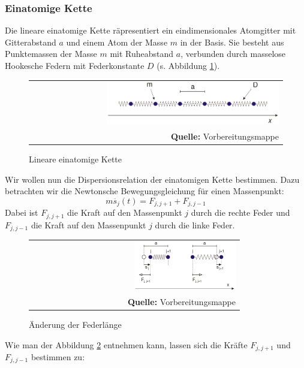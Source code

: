 \documentclass[a4paper,titlepage]{scrartcl}
\numberwithin{equation}{section}
\begin{document}
\subsubsection{Einatomige Kette}
Die lineare einatomige Kette räpresentiert ein eindimensionales Atomgitter mit Gitterabstand $a$ und einem Atom der Masse $m$ in der Basis. Sie besteht aus Punktemassen der Masse $m$ mit Ruheabstand $a$, verbunden durch masselose Hookesche Federn mit Federkonstante $D$ (s. Abbildung \ref{fig:einatomkette}).
\begin{figure}[H]
	\centering
	\begin{tabular}{@{}r@{}}
		\includegraphics[width=0.7\textwidth]{einatomkette.png}\\
		\footnotesize\sffamily\textbf{Quelle:} Vorbereitungsmappe \cite{vorbereitungsmappe}
	\end{tabular}
	\caption{Lineare einatomige Kette}
    \label{fig:einatomkette}
\end{figure}
Wir wollen nun die Dispersionsrelation der einatomigen Kette bestimmen. Dazu betrachten wir die Newtonsche Bewegungsgleichung für einen Massenpunkt:
\begin{equation*}
m\ddot{s_j}(t)=F_{j,j+1}+F_{j,j-1}
\end{equation*}
Dabei ist $F_{j,j+1}$ die Kraft auf den Massenpunkt $j$ durch die rechte Feder und $F_{j,j-1}$ die Kraft auf den Massenpunkt $j$ durch die linke Feder.
\begin{figure}[H]
	\centering
	\begin{tabular}{@{}r@{}}
		\includegraphics[width=0.5\textwidth]{einatomkettekraft.png}\\
		\footnotesize\sffamily\textbf{Quelle:} Vorbereitungsmappe \cite{vorbereitungsmappe}
	\end{tabular}
	\caption{Änderung der Federlänge}
    \label{fig:einatomkettekraft}
\end{figure}
Wie man der Abbildung \ref{fig:einatomkettekraft} entnehmen kann, lassen sich die Kräfte $F_{j,j+1}$ und $F_{j,j-1}$ bestimmen zu:
\end{document}
